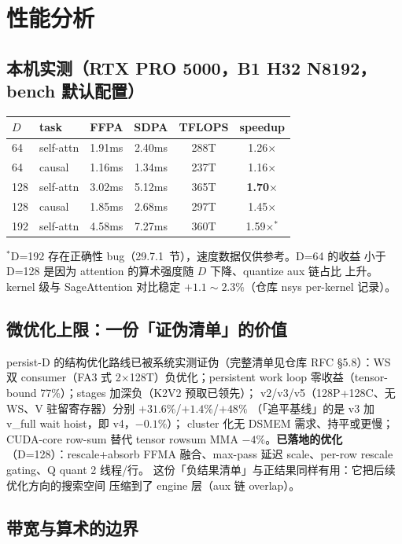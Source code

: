 \section{性能分析}

\subsection{本机实测（RTX PRO 5000，B1 H32 N8192，bench 默认配置）}

\begin{center}
\begin{tabular}{llcccc}
\toprule
$D$ & task & FFPA & SDPA & TFLOPS & speedup \\
\midrule
64  & self-attn & 1.91ms & 2.40ms & 288T & 1.26$\times$ \\
64  & causal    & 1.16ms & 1.34ms & 237T & 1.16$\times$ \\
128 & self-attn & 3.02ms & 5.12ms & 365T & \textbf{1.70$\times$} \\
128 & causal    & 1.85ms & 2.68ms & 297T & 1.45$\times$ \\
192 & self-attn & 4.58ms & 7.27ms & 360T & 1.59$\times$$^{*}$ \\
\bottomrule
\end{tabular}
\end{center}
$^{*}$D=192 存在正确性 bug（29.7.1~节），速度数据仅供参考。D=64 的收益
小于 D=128 是因为 attention 的算术强度随 $D$ 下降、quantize aux 链占比
上升。kernel 级与 SageAttention 对比稳定 $+1.1\sim2.3\%$（仓库 nsys
per-kernel 记录）。

\subsection{微优化上限：一份「证伪清单」的价值}

persist-D 的结构优化路线已被系统实测证伪（完整清单见仓库 RFC
\S5.8）：WS 双 consumer（FA3 式 2$\times$128T）负优化；persistent work
loop 零收益（tensor-bound 77\%）；stages 加深负（K2V2 预取已领先）；
v2/v3/v5（128P+128C、无 WS、V 驻留寄存器）分别 $+31.6\%$/$+1.4\%$/$+48\%$
（「追平基线」的是 v3 加 v\_full wait hoist，即 v4，$-0.1\%$）；
cluster 化无 DSMEM 需求、持平或更慢；CUDA-core row-sum 替代 tensor
rowsum MMA $-4\%$。\textbf{已落地的优化}（D=128）：rescale+absorb FFMA
融合、max-pass 延迟 scale、per-row rescale gating、Q quant 2 线程/行。
这份「负结果清单」与正结果同样有用：它把后续优化方向的搜索空间
压缩到了 engine 层（aux 链 overlap）。

\subsection{带宽与算术的边界}

